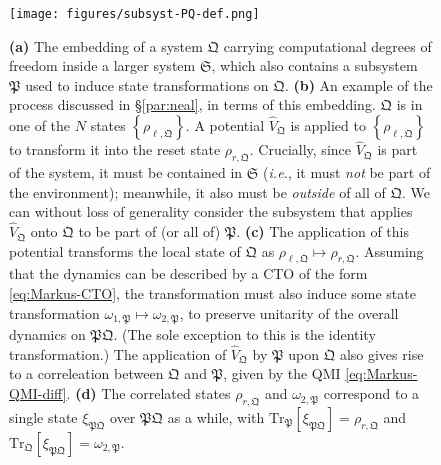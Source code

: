 \documentclass[preprints,article,accept,moreauthors,pdftex]{Definitions/mdpi}
\begin{document}
\begin{paracol}{2}
\begin{figure}[h] 
    \centerline{\texttt{[image: figures/subsyst-PQ-def.png]}}
    \caption{\textbf{(a)} The embedding of a system $\mathfrak{Q}$ carrying computational degrees of freedom inside a larger system $\mathfrak{S}$, which also contains a subsystem $\mathfrak{P}$ used to induce state transformations on $\mathfrak{Q}$. \textbf{(b)} An example of the process discussed in \S\ref{par:neal}, in terms of this embedding. $\mathfrak{Q}$ is in one of the $N$ states $\left\{\rho_{\ell,\mathfrak{Q}}\right\}$. A potential $\widehat{V}_{\mathfrak{Q}}$ is applied to $\left\{\rho_{\ell,\mathfrak{Q}}\right\}$ to transform it into the reset state $\rho_{r,\mathfrak{Q}}$. Crucially, since $\widehat{V}_{\mathfrak{Q}}$ is part of the system, it must be contained in $\mathfrak{S}$ (\emph{i.e.}, it must \emph{not} be part of the environment); meanwhile, it also must be \emph{outside} of all of $\mathfrak{Q}$. We can without loss of generality consider the subsystem that applies $\widehat{V}_{\mathfrak{Q}}$ onto $\mathfrak{Q}$ to be part of (or all of) $\mathfrak{P}$. \textbf{(c)} The application of this potential transforms the local state of $\mathfrak{Q}$ as $\rho_{\ell,\mathfrak{Q}} \mapsto \rho_{r,\mathfrak{Q}}$. Assuming that the dynamics can be described by a CTO of the form \eqref{eq:Markus-CTO}, the transformation must also induce some state transformation $\omega_{1,\mathfrak{P}}\mapsto\omega_{2,\mathfrak{P}}$, to preserve unitarity of the overall dynamics on $\mathfrak{PQ}$. (The sole exception to this is the identity transformation.) The application of $\widehat{V}_{\mathfrak{Q}}$ by $\mathfrak{P}$ upon $\mathfrak{Q}$ also gives rise to a correleation between $\mathfrak{Q}$ and $\mathfrak{P}$, given by the QMI \eqref{eq:Markus-QMI-diff}. \textbf{(d)} The correlated states $\rho_{r,\mathfrak{Q}}$ and $\omega_{2,\mathfrak{P}}$ correspond to a single state $\xi_{\mathfrak{PQ}}$ over $\mathfrak{PQ}$ as a while, with $\mathrm{Tr}_{\mathfrak{P}}\left[\xi_{\mathfrak{PQ}}\right] = \rho_{r,\mathfrak{Q}}$ and $\mathrm{Tr}_{\mathfrak{Q}}\left[\xi_{\mathfrak{PQ}}\right] = \omega_{2,\mathfrak{P}}$. \label{fig:subsyst-PQ-def}}
\end{figure}


\end{paracol}
\end{document}

